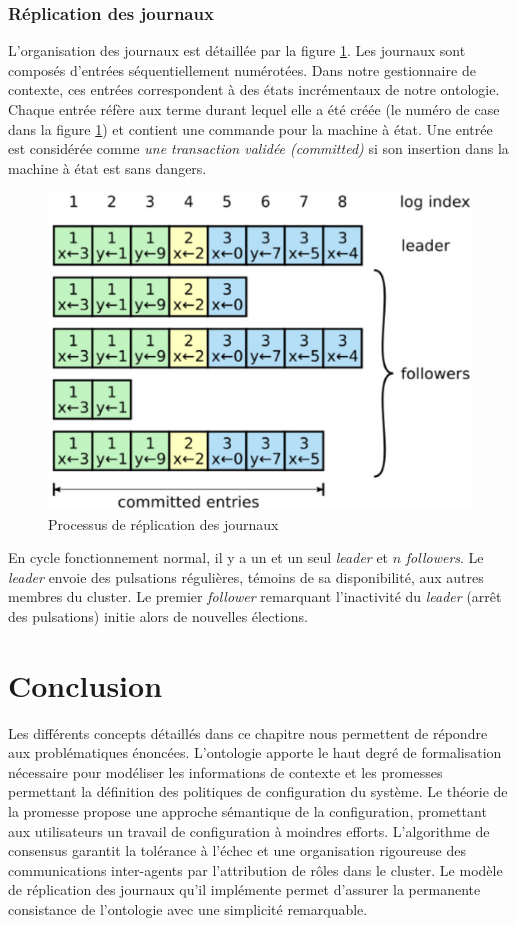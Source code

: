 \subsubsection{Réplication des journaux}

L'organisation des journaux est détaillée par la figure
\ref{fig:log_replication}.  Les journaux sont composés d'entrées
séquentiellement numérotées. Dans notre gestionnaire de contexte, ces entrées
correspondent à des états incrémentaux de notre ontologie. Chaque entrée réfère aux terme
durant lequel elle a été créée (le numéro de case dans la figure
\ref{fig:log_replication}) et contient une commande pour la machine à état. Une
entrée est considérée comme \emph{une transaction validée (committed)} si son
insertion dans la machine à état est sans dangers.

\begin{figure}[H]
    \centerline{\includegraphics[width=.37\textwidth]{img/log_replication}}
    \caption{Processus de réplication des journaux}
    \label{fig:log_replication}
\end{figure}

En cycle fonctionnement normal, il y a un et un seul \emph{leader} et $n$
\emph{followers}. Le \emph{leader} envoie des pulsations régulières, témoins de
sa disponibilité, aux autres membres du cluster. Le premier \emph{follower}
remarquant l'inactivité du \emph{leader} (arrêt des pulsations) initie alors de
nouvelles élections. 

\section{Conclusion}

Les différents concepts détaillés dans ce chapitre nous permettent de répondre
aux problématiques énoncées. L'ontologie apporte le haut degré de formalisation
nécessaire pour modéliser les informations de contexte et les promesses
permettant la définition des politiques de configuration du système.  Le théorie
de la promesse propose une approche sémantique de la configuration, promettant
aux utilisateurs un travail de configuration à moindres efforts.  L'algorithme
de consensus garantit la tolérance à l'échec et une organisation rigoureuse des
communications inter-agents par l'attribution de rôles dans le cluster. Le
modèle de réplication des journaux qu'il implémente permet d'assurer la
permanente consistance de l'ontologie avec une simplicité remarquable.

